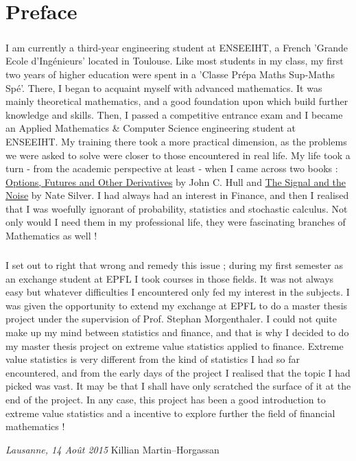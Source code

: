 \chapter*{Preface}

\bigskip
\paragraph{}
I am currently a third-year engineering student at ENSEEIHT, a French 'Grande Ecole d'Ingénieurs' located in Toulouse. Like most students in my class, my first two years of higher education were spent in a 'Classe Prépa Maths Sup-Maths Spé'. There, I began to acquaint myself with advanced mathematics. It was mainly theoretical mathematics, and a good foundation upon which build further knowledge and skills. \newline Then, I passed a competitive entrance exam and I became an Applied Mathematics \& Computer Science  engineering student at ENSEEIHT. My training there took a more practical dimension, as the problems we were asked to solve were closer to those encountered in real life. My life took a turn - from the academic perspective at least - when I came across two books : \underline{Options, Futures and Other Derivatives} by John C. Hull and \underline{The Signal and the Noise} by Nate Silver. I had always had an interest in Finance, and then I realised that I was woefully ignorant of probability, statistics and stochastic calculus. Not only would I need them in my professional life, they were fascinating branches of Mathematics as well !
\paragraph{}
I set out to right that wrong and remedy this issue ; during my first semester as an exchange student at EPFL I took courses in those fields. It was not always easy but whatever difficulties I encountered only fed my interest in the subjects. I was given the opportunity to extend my exchange at EPFL to do a master thesis project under the supervision of Prof. Stephan Morgenthaler. I could not quite make up my mind between statistics and finance, and that is why I decided to do my master thesis project on extreme value statistics applied to finance. Extreme value statistics is very different from the kind of statistics I had so far encountered, and from the early days of the project I realised that the topic I had picked was vast. It may be that I shall have only scratched the surface of it at the end of the project. In any case, this project has been a good introduction to extreme value statistics and a incentive to explore further the field of financial mathematics !




\bigskip
 
\noindent\textit{Lausanne, 14 Ao\^{u}t 2015}
\hfill Killian Martin--Horgassan
